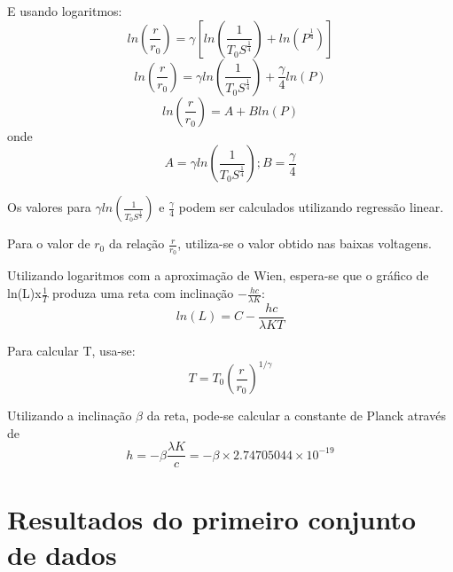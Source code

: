 \documentclass[brazilian,12pt,a4paper,final]{article}
\begin{document}
E usando logaritmos:
$$ln(\frac{r}{r_0})=\gamma[ln(\frac{1}{T_0S^\frac{1}{4}})+ln(P^\frac{1}{4})]$$
$$ln(\frac{r}{r_0})=\gamma ln(\frac{1}{T_0S^\frac{1}{4}})+\frac{\gamma}{4}ln(P)$$
$$ln(\frac{r}{r_0})=A+Bln(P)$$
onde
$$A=\gamma ln(\frac{1}{T_0S^\frac{1}{4}}); B=\frac{\gamma}{4}$$


Os valores para $\gamma ln(\frac{1}{T_0S^\frac{1}{4}})$
e $\frac{\gamma}{4}$ podem ser calculados utilizando regressão linear.

Para o valor de $r_0$ da relação $\frac{r}{r_0}$, utiliza-se o valor obtido 
nas baixas voltagens.

Utilizando logaritmos com a aproximação de Wien, espera-se que 
o gráfico de ln(L)x$\frac{1}{T}$ produza uma reta com inclinação 
$-\frac{hc}{\lambda K}$:
\[
ln(L) =C-\frac{hc}{\lambda KT}
\]

Para calcular T, usa-se:
$$T=T_0(\frac{r}{r_0})^{1/\gamma}$$

Utilizando a inclinação $\beta$ da reta, pode-se calcular a constante de Planck
através de 
\[
h=-\beta \frac{\lambda K}{c}=-\beta \times 2.74705044 \times 10^{-19}
\]

\section{Resultados do primeiro conjunto de dados}
\end{document}
